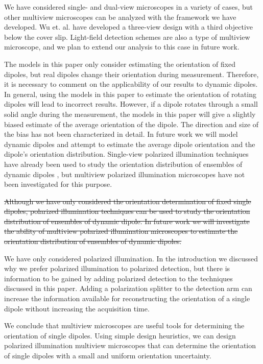 \documentclass[10pt]{article}
\begin{document}
We have considered single- and dual-view microscopes in a variety of cases, but
other multiview microscopes can be analyzed with the framework we have
developed. Wu et. al. have developed a three-view design with a third objective
below the cover slip\cite{wu2016}. Light-field detection schemes are also a type
of multiview microscope\cite{levoy2006}, and we plan to extend our analysis to
this case in future work.

\hypertarget{temporal}{{\color{urlblue} The models in this paper only consider
    estimating the orientation of fixed dipoles, but real dipoles change their
    orientation during measurement. Therefore, it is necessary to comment on the
    applicability of our results to dynamic dipoles. In general, using the
    models in this paper to estimate the orientation of rotating dipoles will
    lead to incorrect results. However, if a dipole rotates through a small
    solid angle during the measurement, the models in this paper will give a
    slightly biased estimate of the average orientation of the dipole. The
    direction and size of the bias has not been characterized in detail. In
    future work we will model dynamic dipoles and attempt to estimate the
    average dipole orientation and the dipole's orientation
    distribution. Single-view polarized illumination techniques have already
    been used to study the orientation distribution of ensembles of dynamic
    dipoles \cite{mehta2016, backer2016}, but multiview polarized illumination
    microscopes have not been investigated for this purpose.}}

{\color{red}\sout{Although we have only considered the orientation determination
    of fixed single dipoles, polarized illumination techniques can be used to
    study the orientation distribution of ensembles of dynamic dipole. In future
    work we will investigate the ability of multiview polarized illumination
    microscopes to estimate the orientation distribution of ensembles of dynamic
    dipoles.}}

We have only considered polarized illumination. In the introduction
we discussed why we prefer polarized illumination to polarized detection, but
there is information to be gained by adding polarized detection to the
techniques discussed in this paper. Adding a polarization splitter to the
detection arm can increase the information available for reconstructing the
orientation of a single dipole without increasing the acquisition time.

We conclude that multiview microscopes are useful tools for determining the
orientation of single dipoles. Using simple design heuristics, we can design
polarized illumination multiview microscopes that can determine the orientation
of single dipoles with a small and uniform orientation uncertainty.
\end{document}
